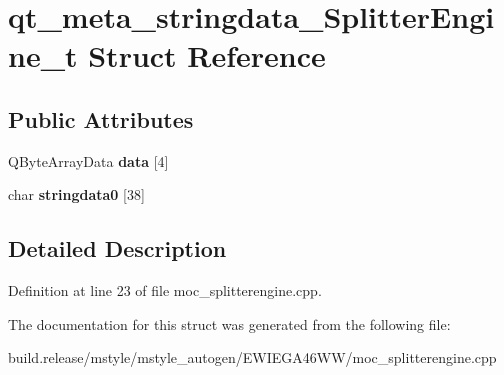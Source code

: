 \hypertarget{structqt__meta__stringdata___splitter_engine__t}{}\section{qt\+\_\+meta\+\_\+stringdata\+\_\+\+Splitter\+Engine\+\_\+t Struct Reference}
\label{structqt__meta__stringdata___splitter_engine__t}
\subsection*{Public Attributes}
\begin{DoxyCompactItemize}
\item 
\mbox{\label{structqt__meta__stringdata___splitter_engine__t_a003ae06ac6bbca671ccea1ee9403ab48}} 
Q\+Byte\+Array\+Data {\bfseries data} \mbox{[}4\mbox{]}
\item 
\mbox{\label{structqt__meta__stringdata___splitter_engine__t_acb066071b2f66b7561812e6dfa929189}} 
char {\bfseries stringdata0} \mbox{[}38\mbox{]}
\end{DoxyCompactItemize}


\subsection{Detailed Description}


Definition at line 23 of file moc\+\_\+splitterengine.\+cpp.



The documentation for this struct was generated from the following file\+:\begin{DoxyCompactItemize}
\item 
build.\+release/mstyle/mstyle\+\_\+autogen/\+E\+W\+I\+E\+G\+A46\+W\+W/moc\+\_\+splitterengine.\+cpp\end{DoxyCompactItemize}

